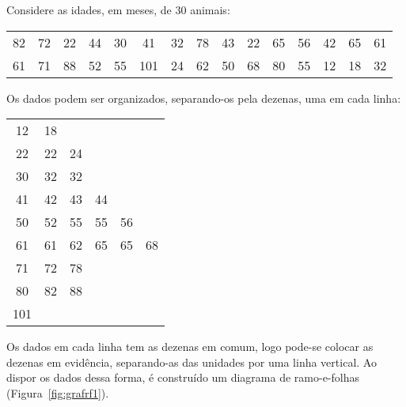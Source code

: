 \documentclass[11pt,fleqn]{book} %
\begin{document}
\begin{example}

	Considere as idades, em meses, de 30 animais:
	
	\begin{center}
	\begin{tabular}{c c c c c c c c c c c c c c c}
	\hline
	82 & 72 & 22 & 44 & 30 & 41 & 32 & 78 & 43 & 22 & 65 & 56 & 42 & 65 & 61 \\
	61 & 71 & 88 & 52 & 55 & 101 & 24 & 62 & 50 & 68 & 80 & 55 & 12 & 18 & 32 \\
	\hline
	\end{tabular}
	\end{center}
	

	Os dados podem ser organizados, separando-os pela dezenas, uma em cada linha:
	
	
	\begin{center}
	\begin{tabular}{c c c c c c}
	\hline
   	12 & 18 &  &  &  & \\
   	22 & 22 & 24  &  &  & \\
   	30 & 32 & 32 &  &  & \\
   	41 & 42 & 43 & 44 &  & \\
   	50 & 52 & 55 & 55 & 56 &  \\
   	61 & 61 & 62 & 65 & 65 & 68 \\
   	71 & 72 & 78 &  &  & \\
   	80 & 82 & 88 &  &  & \\
  	101 &  &  &  &  & \\
	\hline
	\end{tabular}
	\end{center}
	
	
Os dados em cada linha tem as dezenas em comum, logo pode-se colocar as dezenas em evidência, separando-as das unidades por uma linha vertical. Ao dispor os dados dessa forma, é construído um diagrama de ramo-e-folhas (Figura~\ref{fig:grafrf1}).
	

\end{example}
\end{document}

